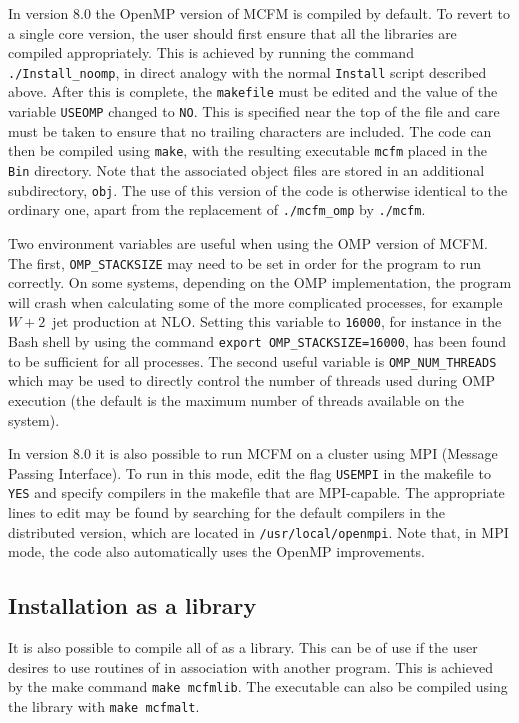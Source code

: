 \documentclass[12pt]{article}
\begin{document}
In version 8.0 the OpenMP version of MCFM is compiled by default.  To revert
to a single core version, the user should first ensure
that all the libraries are compiled appropriately.  This is achieved
by running the command {\tt ./Install\_noomp}, in direct analogy with the
normal {\tt Install} script described above.  After this is complete,
the {\tt makefile} must be edited and the value of the variable
{\tt USEOMP} changed to {\tt NO}.  This is specified near the top
of the file and care must be taken to ensure that no trailing characters
are included.  The code can then be compiled using {\tt make},
with the resulting executable {\tt mcfm} placed in the {\tt Bin}
directory.  Note that the associated object files are stored in an
additional subdirectory, {\tt obj}.  The use of this version
of the code is otherwise identical to the ordinary one, apart from
the replacement of {\tt ./mcfm\_omp} by {\tt ./mcfm}.

Two environment variables are useful when using the OMP version of MCFM.
The first, {\tt OMP\_STACKSIZE} may need to be set in order for the program
to run correctly.  On some systems, depending on the OMP implementation,
the program will crash when calculating some of the more complicated processes,
for example $W+2$~jet production at NLO.  Setting this
variable to {\tt 16000}, for instance in the Bash shell by using the
command {\tt export OMP\_STACKSIZE=16000}, has been found to be sufficient
for all processes.  The second useful variable is {\tt OMP\_NUM\_THREADS}
which may be used to directly control the number of threads used during
OMP execution (the default is the maximum number of threads available
on the system).

In version 8.0 it is also possible to run MCFM on a cluster using MPI
(Message Passing Interface).  To run in this  mode, edit the flag {\tt USEMPI}
in the makefile to {\tt YES} and specify compilers in the makefile
that are MPI-capable.  The appropriate lines to edit may be found by
searching for the default compilers in the distributed version,
which are located in {\tt /usr/local/openmpi}.  Note that, in MPI mode, the code
also automatically uses the OpenMP improvements.

\subsection{Installation as a library}
It is also possible to compile all of \MCFM as a library.
This can be of use if the user desires to use routines of \MCFM 
in association with another program. This is achieved by the make command
{\tt make mcfmlib}.  The \MCFM executable can also be compiled using
the library with {\tt make mcfmalt}.
 
\end{document}
